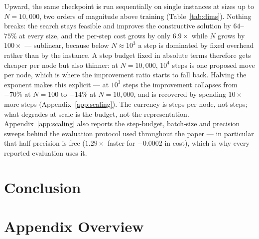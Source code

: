 \documentclass[letterpaper]{article} %
\begin{document}
Upward, the same checkpoint is run sequentially on single instances at sizes up to $N = 10{,}000$, two orders of magnitude above training (Table~\ref{tab:dims}). Nothing breaks: the search stays feasible and improves the constructive solution by $64$--$75\%$ at every size, and the per-step cost grows by only $6.9\times$ while $N$ grows by $100\times$ --- sublinear, because below $N \approx 10^{3}$ a step is dominated by fixed overhead rather than by the instance. A step budget fixed in absolute terms therefore gets cheaper per node but also thinner: at $N = 10{,}000$, $10^{4}$ steps is one proposed move per node, which is where the improvement ratio starts to fall back. Halving the exponent makes this explicit --- at $10^{3}$ steps the improvement collapses from $-70\%$ at $N = 100$ to $-14\%$ at $N = 10{,}000$, and is recovered by spending $10\times$ more steps (Appendix~\ref{app:scaling}). The currency is steps per node, not steps; what degrades at scale is the budget, not the representation. Appendix~\ref{app:scaling} also reports the step-budget, batch-size and precision sweeps behind the evaluation protocol used throughout the paper --- in particular that half precision is free ($1.29\times$ faster for $-0.0002$ in cost), which is why every reported evaluation uses it.

\section{Conclusion}

\clearpage



\clearpage
\appendix

\section*{Appendix Overview}
\end{document}
